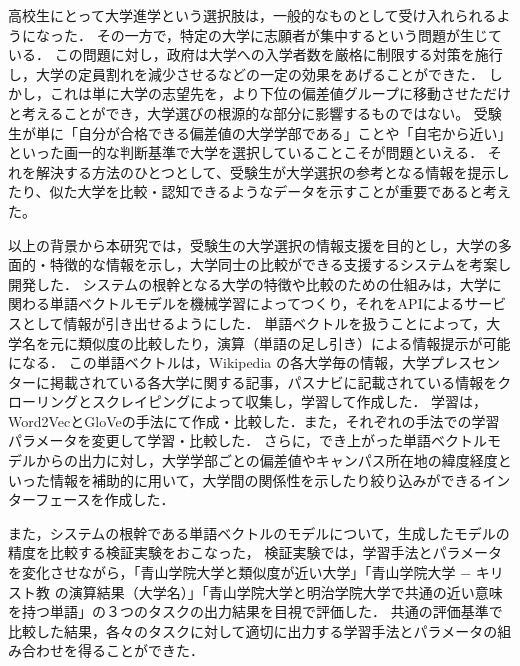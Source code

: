 高校生にとって大学進学という選択肢は，一般的なものとして受け入れられるようになった．
その一方で，特定の大学に志願者が集中するという問題が生じている．
この問題に対し，政府は大学への入学者数を厳格に制限する対策を施行し，大学の定員割れを減少させるなどの一定の効果をあげることができた．
しかし，これは単に大学の志望先を，より下位の偏差値グループに移動させただけと考えることができ，大学選びの根源的な部分に影響するものではない。
受験生が単に「自分が合格できる偏差値の大学学部である」ことや「自宅から近い」といった画一的な判断基準で大学を選択していることこそが問題といえる．
それを解決する方法のひとつとして、受験生が大学選択の参考となる情報を提示したり、似た大学を比較・認知できるようなデータを示すことが重要であると考えた。

以上の背景から本研究では，受験生の大学選択の情報支援を目的とし，大学の多面的・特徴的な情報を示し，大学同士の比較ができる支援するシステムを考案し開発した．
システムの根幹となる大学の特徴や比較のための仕組みは，大学に関わる単語ベクトルモデルを機械学習によってつくり，それをAPIによるサービスとして情報が引き出せるようにした．
単語ベクトルを扱うことによって，大学名を元に類似度の比較したり，演算（単語の足し引き）による情報提示が可能になる．
この単語ベクトルは，Wikipedia の各大学毎の情報，大学プレスセンターに掲載されている各大学に関する記事，パスナビに記載されている情報をクローリングとスクレイピングによって収集し，学習して作成した．
学習は，Word2VecとGloVeの手法にて作成・比較した．また，それぞれの手法での学習パラメータを変更して学習・比較した．
さらに，でき上がった単語ベクトルモデルからの出力に対し，大学学部ごとの偏差値やキャンパス所在地の緯度経度といった情報を補助的に用いて，大学間の関係性を示したり絞り込みができるインターフェースを作成した．

また，システムの根幹である単語ベクトルのモデルについて，生成したモデルの精度を比較する検証実験をおこなった，
検証実験では，学習手法とパラメータを変化させながら，「青山学院大学と類似度が近い大学」「青山学院大学 $-$ キリスト教 の演算結果（大学名）」「青山学院大学と明治学院大学で共通の近い意味を持つ単語」の３つのタスクの出力結果を目視で評価した．
共通の評価基準で比較した結果，各々のタスクに対して適切に出力する学習手法とパラメータの組み合わせを得ることができた．
